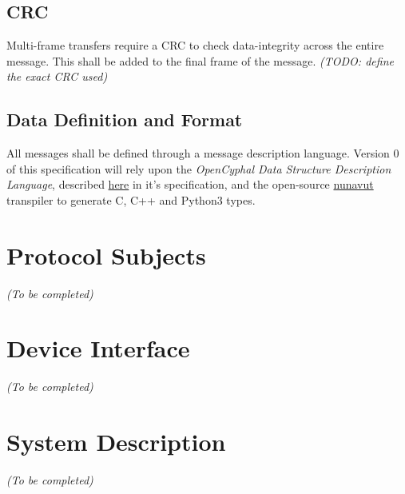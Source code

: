 \documentclass[a4paper,12pt]{article}
\begin{document}
\subsection{CRC}
Multi-frame transfers require a CRC to check data-integrity across the entire message. This shall be added to the final frame of the message.
\textit{(TODO: define the exact CRC used)}

\subsection{Data Definition and Format}
All messages shall be defined through a message description language. Version 0 of this specification will rely upon the \textit{OpenCyphal Data Structure Description Language}, described \href{https://opencyphal.org/specification/Cyphal_Specification.pdf#page=15}{here} in it's specification, and the open-source \href{https://github.com/OpenCyphal/nunavut}{nunavut} transpiler to generate C, C++ and Python3 types.
\section{Protocol Subjects}
\label{sec:protocol-subjects}
\textit{(To be completed)}

\section{Device Interface}
\label{sec:device-interface}
\textit{(To be completed)}

\section{System Description}
\label{sec:system-description}
\textit{(To be completed)}
\end{document}
